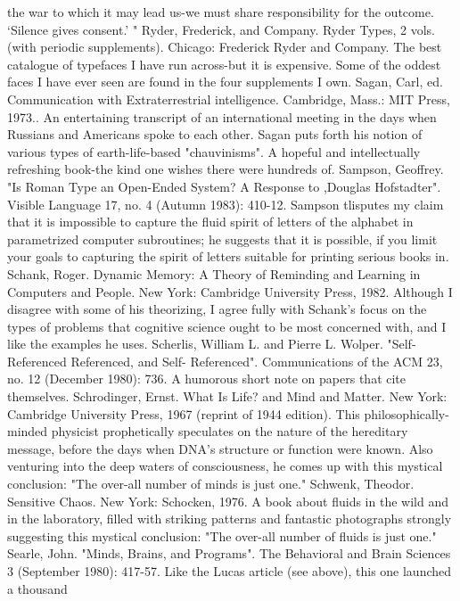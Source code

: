   the war to which it may lead us-we must share responsibility for the outcome. `Silence
  gives consent.' "
Ryder, Frederick, and Company. Ryder Types, 2 vols. (with periodic supplements). Chicago:
  Frederick Ryder and Company. The best catalogue of typefaces I have run across-but it is
  expensive. Some of the oddest faces I have ever seen are found in the four supplements I
  own.
Sagan, Carl, ed. Communication with Extraterrestrial intelligence. Cambridge, Mass.: MIT
  Press, 1973.. An entertaining transcript of an international meeting in the days when
  Russians and Americans spoke to each other. Sagan puts forth his notion of various types of
  earth-life-based "chauvinisms". A hopeful and intellectually refreshing book-the kind one
  wishes there were hundreds of.
Sampson, Geoffrey. "Is Roman Type an Open-Ended System? A Response to ,Douglas
  Hofstadter". Visible Language 17, no. 4 (Autumn 1983): 410-12. Sampson tlisputes my
  claim that it is impossible to capture the fluid spirit of letters of the alphabet in parametrized
  computer subroutines; he suggests that it is possible, if you limit your goals to capturing the
  spirit of letters suitable for printing serious books in.
Schank, Roger. Dynamic Memory: A Theory of Reminding and Learning in Computers and
  People. New York: Cambridge University Press, 1982. Although I disagree with some of
  his theorizing, I agree fully with Schank's focus on the types of problems that cognitive
  science ought to be most concerned with, and I like the examples he uses.
Scherlis, William L. and Pierre L. Wolper. "Self-Referenced Referenced, and Self-
  Referenced". Communications of the ACM 23, no. 12 (December 1980): 736. A humorous
  short note on papers that cite themselves.
Schrodinger, Ernst. What Is Life? and Mind and Matter. New York: Cambridge University
  Press, 1967 (reprint of 1944 edition). This philosophically-minded physicist prophetically
  speculates on the nature of the hereditary message, before the days when DNA's structure or
  function were known. Also venturing into the deep waters of consciousness, he comes up
  with this mystical conclusion: "The over-all number of minds is just one."
Schwenk, Theodor. Sensitive Chaos. New York: Schocken, 1976. A book about fluids in the
  wild and in the laboratory, filled with striking patterns and fantastic photographs strongly
  suggesting this mystical conclusion: "The over-all number of fluids is just one."
Searle, John. "Minds, Brains, and Programs". The Behavioral and Brain Sciences 3
  (September 1980): 417-57. Like the Lucas article (see above), this one launched a thousand
